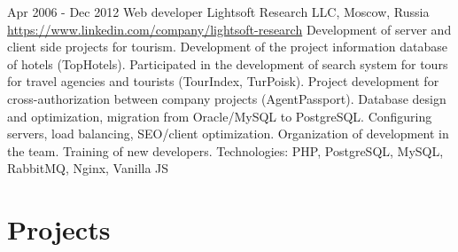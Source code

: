 \documentclass[11pt,a4paper]{moderncv}
\begin{document}
\cventry
  {Apr 2006 - Dec 2012}
  {Web developer}
  {Lightsoft Research LLC, Moscow, Russia}
  {\newline{}\url{https://www.linkedin.com/company/lightsoft-research}}{}
  {Development of server and client side projects for tourism.\newline{}
  Development of the project information database of hotels (TopHotels).\newline{}
  Participated in the development of search system for tours for travel agencies and tourists (TourIndex, TurPoisk).\newline{}
  Project development for cross-authorization between company projects (AgentPassport).\newline{}
  Database design and optimization, migration from Oracle/MySQL to PostgreSQL. Configuring servers, load balancing, SEO/client optimization.\newline{}
  Organization of development in the team. Training of new developers.\newline{}
  Technologies: PHP, PostgreSQL, MySQL, RabbitMQ, Nginx, Vanilla JS}

\newpage

\section{Projects}
\end{document}
